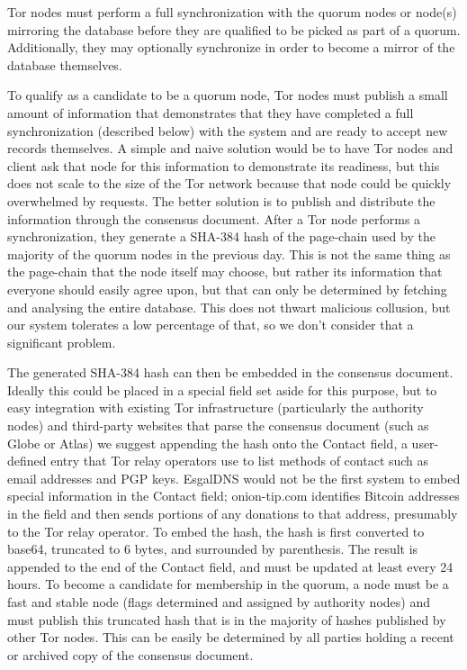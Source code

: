 Tor nodes must perform a full synchronization with the quorum nodes or node(s) mirroring the database before they are qualified to be picked as part of a quorum. Additionally, they may optionally synchronize in order to become a mirror of the database themselves.

To qualify as a candidate to be a quorum node, Tor nodes must publish a small amount of information that demonstrates that they have completed a full synchronization (described below) with the system and are ready to accept new records themselves. A simple and naive solution would be to have Tor nodes and client ask that node for this information to demonstrate its readiness, but this does not scale to the size of the Tor network because that node could be quickly overwhelmed by requests. The better solution is to publish and distribute the information through the consensus document. After a Tor node performs a synchronization, they generate a SHA-384 hash of the page-chain used by the majority of the quorum nodes in the previous day. This is not the same thing as the page-chain that the node itself may choose, but rather its information that everyone should easily agree upon, but that can only be determined by fetching and analysing the entire database. This does not thwart malicious collusion, but our system tolerates a low percentage of that, so we don't consider that a significant problem.

The generated SHA-384 hash can then be embedded in the consensus document. Ideally this could be placed in a special field set aside for this purpose, but to easy integration with existing Tor infrastructure (particularly the authority nodes) and third-party websites that parse the consensus document (such as Globe or Atlas) we suggest appending the hash onto the Contact field, a user-defined entry that Tor relay operators use to list methods of contact such as email addresses and PGP keys. EsgalDNS would not be the first system to embed special information in the Contact field; onion-tip.com identifies Bitcoin addresses in the field and then sends portions of any donations to that address, presumably to the Tor relay operator. To embed the hash, the hash is first converted to base64, truncated to 6 bytes, and surrounded by parenthesis. The result is appended to the end of the Contact field, and must be updated at least every 24 hours. To become a candidate for membership in the quorum, a node must be a fast and stable node (flags determined and assigned by authority nodes) and must publish this truncated hash that is in the majority of hashes published by other Tor nodes. This can be easily be determined by all parties holding a recent or archived copy of the consensus document.

